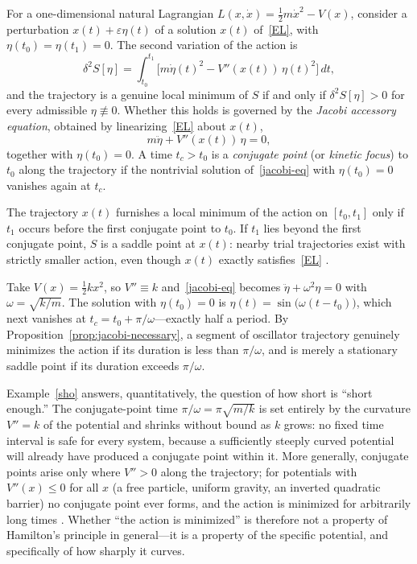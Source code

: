 For a one-dimensional natural Lagrangian $L(x,\dot x) = \tfrac12 m\dot x^2 -
V(x)$, consider a perturbation $x(t)+\varepsilon\eta(t)$ of a solution $x(t)$
of~\eqref{EL}, with $\eta(t_0)=\eta(t_1)=0$. The second variation of the action
is
\begin{equation}
\delta^2 S[\eta] = \int_{t_0}^{t_1} \Big[ m\dot\eta(t)^2 - V''(x(t))\,\eta(t)^2 \Big]\, dt ,
\end{equation}
and the trajectory is a genuine local minimum of $S$ if and only if
$\delta^2S[\eta]>0$ for every admissible $\eta\not\equiv0$. Whether this holds
is governed by the \emph{Jacobi accessory equation}, obtained by
linearizing~\eqref{EL} about $x(t)$,
\begin{equation}
\label{jacobi-eq}
m\ddot\eta + V''(x(t))\,\eta = 0 ,
\end{equation}
together with $\eta(t_0)=0$. A time $t_c>t_0$ is a \emph{conjugate point} (or
\emph{kinetic focus}) to $t_0$ along the trajectory if the nontrivial solution
of~\eqref{jacobi-eq} with $\eta(t_0)=0$ vanishes again at $t_c$.

\begin{proposition}
\label{prop:jacobi-necessary}
The trajectory $x(t)$ furnishes a local minimum of the action on $[t_0,t_1]$
    only if $t_1$ occurs before the first conjugate point to $t_0$. If $t_1$
    lies beyond the first conjugate point, $S$ is a saddle point at $x(t)$:
    nearby trial trajectories exist with strictly smaller action, even though
    $x(t)$ exactly satisfies~\eqref{EL} \cite{gelfandfomin1963,gray2009}.
\end{proposition}

\begin{example}
\label{sho}
Take $V(x)=\tfrac12 kx^2$, so $V''\equiv k$ and~\eqref{jacobi-eq} becomes
    $\ddot\eta+\omega^2\eta=0$ with $\omega=\sqrt{k/m}$. The solution with
    $\eta(t_0)=0$ is $\eta(t)=\sin\!\big(\omega(t-t_0)\big)$, which next
    vanishes at $t_c=t_0+\pi/\omega$---exactly half a period. By
    Proposition~\ref{prop:jacobi-necessary}, a segment of oscillator trajectory
    genuinely minimizes the action if its duration is less than $\pi/\omega$,
    and is merely a stationary saddle point if its duration exceeds
    $\pi/\omega$.
\end{example}

Example~\ref{sho} answers, quantitatively, the question of how short is ``short
enough.'' The conjugate-point time $\pi/\omega=\pi\sqrt{m/k}$ is set entirely
by the curvature $V''=k$ of the potential and shrinks without bound as $k$
grows: no fixed time interval is safe for every system, because a sufficiently
steeply curved potential will already have produced a conjugate point within
it. More generally, conjugate points arise only where $V''>0$ along the
trajectory; for potentials with $V''(x)\leq 0$ for all $x$ (a free particle,
uniform gravity, an inverted quadratic barrier) no conjugate point ever forms,
and the action is minimized for arbitrarily long times \cite{gray2009}.
Whether ``the action is minimized'' is therefore not a property of Hamilton's
principle in general---it is a property of the specific potential, and
specifically of how sharply it curves.

